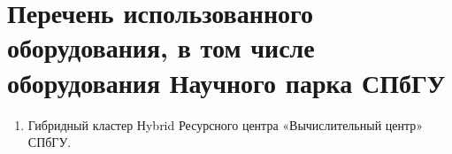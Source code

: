 \section{Перечень использованного оборудования, в том числе оборудования  Научного парка СПбГУ}

\begin{enumerate}
  \item Гибридный кластер Нybrid Ресурсного центра «Вычислительный центр» СПбГУ.
\end{enumerate}
